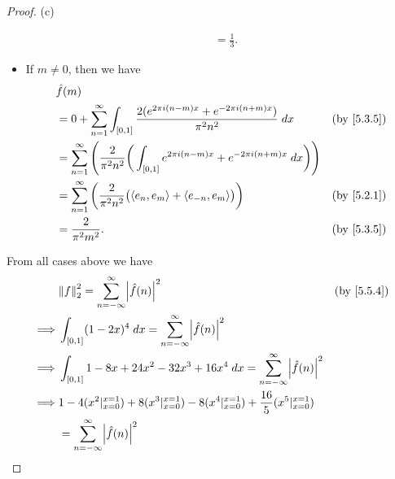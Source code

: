 \begin{proof}{(c)}
\begin{itemize}
\begin{align*}
                       & = \frac{1}{3}.
          \end{align*}
    \item If \(m \neq 0\), then we have
          \begin{align*}
             & \hat{f}(m)                                                                                                                                                       \\
             & = 0 + \sum_{n = 1}^\infty \int_{[0, 1]} \frac{2 (e^{2 \pi i (n - m) x} + e^{- 2 \pi i (n + m) x})}{\pi^2 n^2} \; dx                   & \text{(by \cref{5.3.5})} \\
             & = \sum_{n = 1}^\infty \Bigg(\frac{2}{\pi^2 n^2} \bigg(\int_{[0, 1]} e^{2 \pi i (n - m) x} + e^{- 2 \pi i (n + m) x} \; dx\bigg)\Bigg)                            \\
             & = \sum_{n = 1}^\infty \bigg(\frac{2}{\pi^2 n^2} \big(\inner*{e_n, e_m} + \inner*{e_{-n}, e_m}\big)\bigg)                              & \text{(by \cref{5.2.1})} \\
             & = \frac{2}{\pi^2 m^2}.                                                                                                                & \text{(by \cref{5.3.5})}
          \end{align*}
  \end{itemize}
  From all cases above we have
  \begin{align*}
             & \norm*{f}_2^2 = \sum_{n = -\infty}^\infty \abs{\hat{f}(n)}^2                                                                     & \text{(by \cref{5.5.4})}      \\
    \implies & \int_{[0, 1]} (1 - 2x)^4 \; dx = \sum_{n = -\infty}^\infty \abs{\hat{f}(n)}^2                                                                                    \\
    \implies & \int_{[0, 1]} 1 - 8x + 24x^2 - 32x^3 + 16x^4 \; dx = \sum_{n = -\infty}^\infty \abs{\hat{f}(n)}^2                                                                \\
    \implies & 1 - 4 (x^2|_{x = 0}^{x = 1}) + 8 (x^3|_{x = 0}^{x = 1}) - 8(x^4|_{x = 0}^{x = 1}) + \frac{16}{5}(x^5|_{x = 0}^{x = 1})                                           \\
             & = \sum_{n = -\infty}^\infty \abs{\hat{f}(n)}^2                                                                                                                   \\

\end{align*}
\end{proof}
